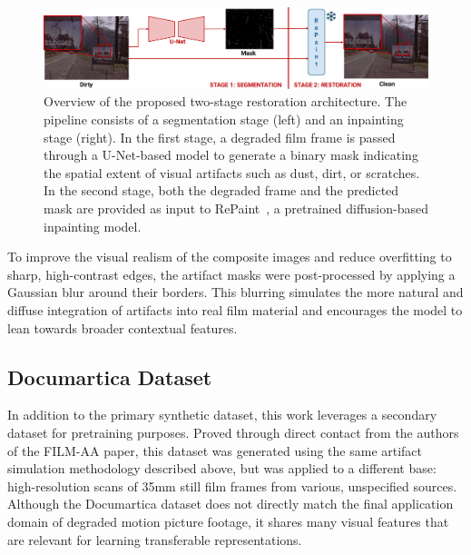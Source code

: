 \documentclass[10pt,a4paper,twocolumn,twoside]{article}
\begin{document}
\begin{figure}[t]
  \centering
    \includegraphics[width= \textwidth]{img/Diagrama_Two_Stage_BO.pdf}\vspace{-0.6em}
    \caption{ \small
Overview of the proposed two-stage restoration architecture. The pipeline consists of a segmentation stage (left) and an inpainting stage (right). In the first stage, a degraded film frame is passed through a U-Net-based model to generate a binary mask indicating the spatial extent of visual artifacts such as dust, dirt, or scratches. In the second stage, both the degraded frame and the predicted mask are provided as input to RePaint~\cite{repaint}, a pretrained diffusion-based inpainting model. 
}
    \label{fig:two-stage}
\end{figure}

To improve the visual realism of the composite images and reduce overfitting to sharp, high-contrast edges, the artifact masks were post-processed by applying a Gaussian blur around their borders. This blurring simulates the more natural and diffuse integration of artifacts into real film material and encourages the model to lean towards broader contextual features.
\subsection{Documartica Dataset}
In addition to the primary synthetic dataset, this work leverages a secondary dataset for pretraining purposes. Proved through direct contact from the authors of the FILM-AA paper, this dataset was generated using the same artifact simulation methodology described above, but was applied to a different base: high-resolution scans of 35mm still film frames from various, unspecified sources. \\ Although the Documartica dataset does not directly match the final application domain of degraded motion picture footage, it shares many visual features that are relevant for learning transferable representations.
\end{document}

